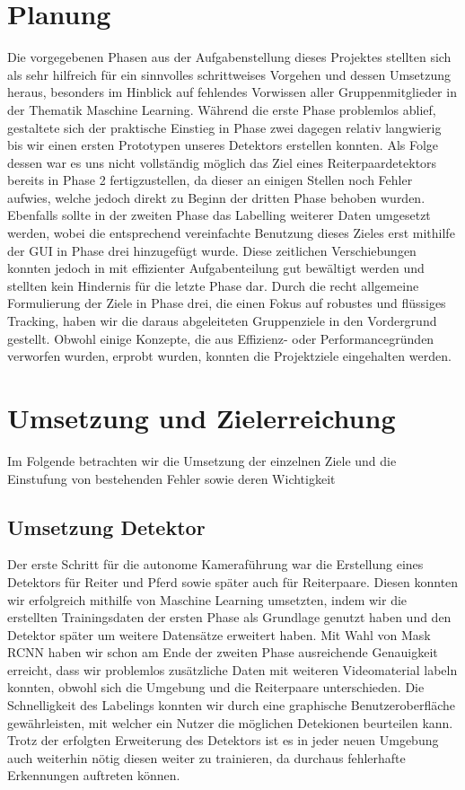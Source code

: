 \section{Planung}
Die vorgegebenen Phasen aus der Aufgabenstellung dieses Projektes stellten sich als sehr hilfreich für ein sinnvolles schrittweises Vorgehen und dessen Umsetzung heraus, besonders im Hinblick auf fehlendes Vorwissen aller Gruppenmitglieder in der Thematik Maschine Learning. Während die erste Phase problemlos ablief, gestaltete sich der praktische Einstieg in Phase zwei dagegen relativ langwierig bis wir einen ersten Prototypen unseres Detektors erstellen konnten. Als Folge dessen war es uns nicht vollständig möglich das Ziel eines Reiterpaardetektors bereits in Phase 2 fertigzustellen, da dieser an einigen Stellen noch Fehler aufwies, welche jedoch direkt zu Beginn der dritten Phase behoben wurden. Ebenfalls sollte in der zweiten Phase das Labelling weiterer Daten umgesetzt werden, wobei die entsprechend vereinfachte Benutzung dieses Zieles erst mithilfe der GUI in Phase drei hinzugefügt wurde. Diese zeitlichen Verschiebungen konnten jedoch in mit effizienter Aufgabenteilung gut bewältigt werden und stellten kein Hindernis für die letzte Phase dar.
Durch die recht allgemeine Formulierung der Ziele in Phase drei, die einen Fokus auf robustes und flüssiges Tracking, haben wir die daraus abgeleiteten Gruppenziele in den Vordergrund gestellt. Obwohl einige Konzepte, die aus Effizienz- oder Performancegründen verworfen wurden, erprobt wurden, konnten die Projektziele eingehalten werden. 

\section{Umsetzung und Zielerreichung}
Im Folgende betrachten wir die Umsetzung der einzelnen Ziele und die Einstufung von bestehenden Fehler sowie deren Wichtigkeit



\subsection*{Umsetzung Detektor}
Der erste Schritt für die autonome Kameraführung war die Erstellung eines Detektors für Reiter und Pferd sowie später auch für Reiterpaare. Diesen konnten wir erfolgreich mithilfe von Maschine Learning umsetzten, indem wir die erstellten Trainingsdaten der ersten Phase als Grundlage genutzt haben und den Detektor später um weitere Datensätze erweitert haben. Mit Wahl von Mask RCNN haben wir schon am Ende der zweiten Phase ausreichende Genauigkeit erreicht, dass wir problemlos zusätzliche Daten mit weiteren Videomaterial labeln konnten, obwohl sich die Umgebung und die Reiterpaare unterschieden. Die Schnelligkeit des Labelings konnten wir durch eine graphische Benutzeroberfläche gewährleisten, mit welcher ein Nutzer die möglichen Detekionen beurteilen kann. Trotz der erfolgten Erweiterung des Detektors ist es in jeder neuen Umgebung auch weiterhin nötig diesen weiter zu trainieren, da durchaus fehlerhafte Erkennungen auftreten können.



